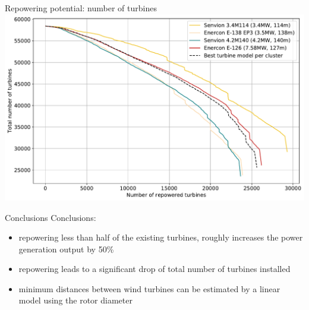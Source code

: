 \documentclass[color=usenames,dvipsnames]{beamer}
\begin{document}
    \begin{frame}{Repowering potential: number of turbines}
        \includegraphics[width=\textwidth]{../../figures/repower_potential-direction-dependent_num_turbines.pdf}
    \end{frame}

    \begin{frame}{Conclusions}
        Conclusions:\\
        \begin{itemize}
            \item repowering less than half of the existing turbines, roughly increases the
                power generation output by 50\%\pause
            \item repowering leads to a significant drop of total number of
                turbines installed\pause
            \item minimum distances between wind turbines can be estimated by a
                linear model using the rotor diameter\pause
        \end{itemize}
    \end{frame}
\end{document}
